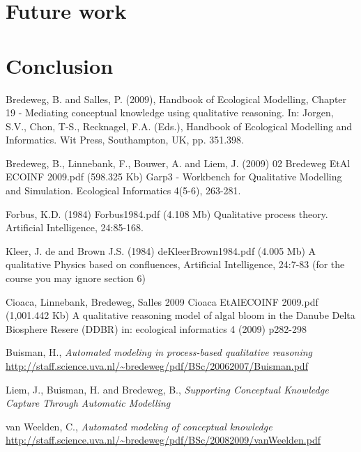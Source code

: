 \documentclass{article}
\begin{document}
\section{Future work}


\section{Conclusion}



\begin{thebibliography}{99}


 Bredeweg, B. and Salles, P. (2009), Handbook of
Ecological Modelling, Chapter 19 - Mediating conceptual knowledge using
qualitative reasoning. In: J\/orgen, S.V., Chon, T-S., Recknagel, F.A. (Eds.),
Handbook of Ecological Modelling and Informatics. Wit Press, Southampton, UK,
pp. 351.398.

 Bredeweg, B., Linnebank, F., Bouwer, A. and Liem, J.
(2009) 02 Bredeweg EtAl ECOINF 2009.pdf (598.325 Kb) Garp3 - Workbench for
Qualitative Modelling and Simulation. Ecological Informatics 4(5-6), 263-281.

 Forbus, K.D. (1984) Forbus1984.pdf (4.108 Mb) Qualitative
process theory. Artificial Intelligence, 24:85-168. 

 Kleer, J. de and Brown J.S. (1984) deKleerBrown1984.pdf (4.005
Mb) A qualitative Physics based on confluences, Artificial Intelligence,
24:7-83 (for the course you may ignore section 6)

 Cioaca, Linnebank, Bredeweg, Salles 2009 Cioaca EtAlECOINF
2009.pdf (1,001.442 Kb) A qualitative reasoning model of algal bloom in the
Danube Delta Biosphere Resere (DDBR) in: ecological informatics 4 (2009)
p282-298

 Buisman, H., \emph{Automated modeling in process-based
qualitative reasoning}
\url{http://staff.science.uva.nl/~bredeweg/pdf/BSc/20062007/Buisman.pdf}

 Liem, J., Buisman, H. and Bredeweg, B., \emph{Supporting
Conceptual Knowledge Capture Through Automatic Modelling}

 van Weelden, C., \emph{Automated modeling of conceptual
knowledge}
\url{http://staff.science.uva.nl/~bredeweg/pdf/BSc/20082009/vanWeelden.pdf}

\end{thebibliography}
\end{document}
